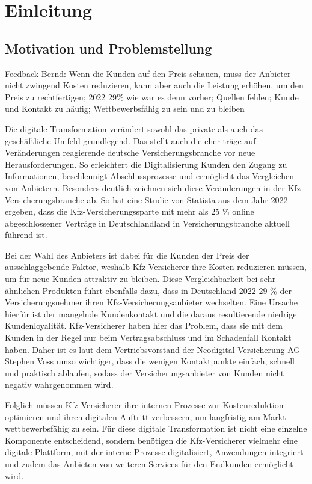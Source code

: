 \chapter{Einleitung}

\section{Motivation und Problemstellung}

Feedback Bernd: Wenn die Kunden auf den Preis schauen, muss der Anbieter nicht zwingend Kosten reduzieren, kann aber auch die Leistung erhöhen, um den Preis zu rechtfertigen; 2022 29\% wie war es denn vorher; Quellen fehlen; Kunde und Kontakt zu häufig; Wettbewerbsfähig zu sein und zu bleiben 

Die digitale Transformation verändert sowohl das private als auch das geschäftliche Umfeld grundlegend. Das stellt auch die eher träge auf Veränderungen reagierende deutsche Versicherungsbranche vor neue Herausforderungen. So erleichtert die Digitalisierung Kunden den Zugang zu Informationen, beschleunigt Abschlussprozesse und ermöglicht das Vergleichen von Anbietern. Besonders deutlich zeichnen sich diese Veränderungen in der Kfz-Versicherungsbranche ab. So hat eine Studie von Statista aus dem Jahr 2022 ergeben, dass die Kfz-Versicherungssparte mit mehr als 25 \% online abgeschlossener Verträge in Deutschlandland in Versicherungsbranche aktuell führend ist.

Bei der Wahl des Anbieters ist dabei für die Kunden der Preis der ausschlaggebende Faktor, weshalb Kfz-Versicherer ihre Kosten reduzieren müssen, um für neue Kunden attraktiv zu bleiben. Diese Vergleichbarkeit bei sehr ähnlichen Produkten führt ebenfalls dazu, dass in Deutschland 2022 29 \% der Versicherungsnehmer ihren Kfz-Versicherungsanbieter wechselten. Eine Ursache hierfür ist der mangelnde Kundenkontakt und die daraus resultierende niedrige Kundenloyalität. Kfz-Versicherer haben hier das Problem, dass sie mit dem Kunden in der Regel nur beim Vertragsabschluss und im Schadenfall Kontakt haben. Daher ist es laut dem Vertriebsvorstand der Neodigital Versicherung AG Stephen Voss umso wichtiger, dass die wenigen Kontaktpunkte einfach, schnell und praktisch ablaufen, sodass der Versicherungsanbieter von Kunden nicht negativ wahrgenommen wird. 

Folglich müssen Kfz-Versicherer ihre internen Prozesse zur Kostenreduktion optimieren und ihren digitalen Auftritt verbessern, um  langfristig am Markt wettbewerbsfähig zu sein. Für diese digitale Transformation ist nicht eine einzelne Komponente entscheidend, sondern benötigen die Kfz-Versicherer vielmehr eine digitale Plattform, mit der interne Prozesse digitalisiert, Anwendungen integriert und zudem das Anbieten von weiteren Services für den Endkunden ermöglicht wird.

